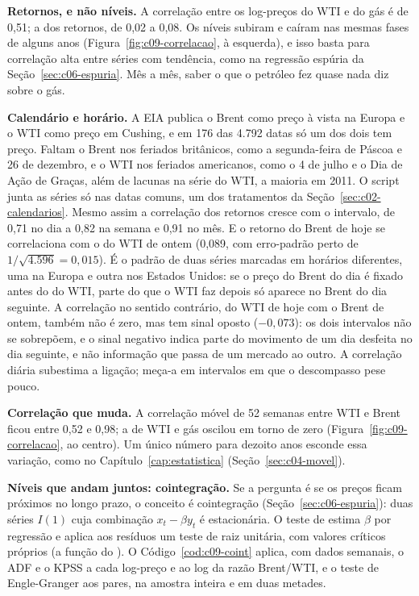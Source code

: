 
\textbf{Retornos, e não níveis.} A correlação entre os log-preços do WTI e do gás é de 0,51; a dos retornos, de 0,02 a 0,08. Os níveis subiram e caíram nas mesmas fases de alguns anos (Figura~\ref{fig:c09-correlacao}, à esquerda), e isso basta para correlação alta entre séries com tendência, como na regressão espúria da Seção~\ref{sec:c06-espuria}. Mês a mês, saber o que o petróleo fez quase nada diz sobre o gás.

\textbf{Calendário e horário.} A EIA publica o Brent como preço à vista na Europa e o WTI como preço em Cushing, e em 176 das 4.792 datas só um dos dois tem preço. Faltam o Brent nos feriados britânicos, como a segunda-feira de Páscoa e 26 de dezembro, e o WTI nos feriados americanos, como o 4 de julho e o Dia de Ação de Graças, além de lacunas na série do WTI, a maioria em 2011. O script junta as séries só nas datas comuns, um dos tratamentos da Seção~\ref{sec:c02-calendarios}. Mesmo assim a correlação dos retornos cresce com o intervalo, de 0,71 no dia a 0,82 na semana e 0,91 no mês. E o retorno do Brent de hoje se correlaciona com o do WTI de ontem (0,089, com erro-padrão perto de $1/\sqrt{4.596} = 0,015$). É o padrão de duas séries marcadas em horários diferentes, uma na Europa e outra nos Estados Unidos: se o preço do Brent do dia é fixado antes do do WTI, parte do que o WTI faz depois só aparece no Brent do dia seguinte. A correlação no sentido contrário, do WTI de hoje com o Brent de ontem, também não é zero, mas tem sinal oposto ($-0,073$): os dois intervalos não se sobrepõem, e o sinal negativo indica parte do movimento de um dia desfeita no dia seguinte, e não informação que passa de um mercado ao outro. A correlação diária subestima a ligação; meça-a em intervalos em que o descompasso pese pouco.

\textbf{Correlação que muda.} A correlação móvel de 52 semanas entre WTI e Brent ficou entre 0,52 e 0,98; a de WTI e gás oscilou em torno de zero (Figura~\ref{fig:c09-correlacao}, ao centro). Um único número para dezoito anos esconde essa variação, como no Capítulo~\ref{cap:estatistica} (Seção~\ref{sec:c04-movel}).

\textbf{Níveis que andam juntos: cointegração.} Se a pergunta é se os preços ficam próximos no longo prazo, o conceito é cointegração (Seção~\ref{sec:c06-espuria}): duas séries $I(1)$ cuja combinação $x_t - \beta y_t$ é estacionária. O teste de \citet{engle1987} estima $\beta$ por regressão e aplica aos resíduos um teste de raiz unitária, com valores críticos próprios (a função  do ). O Código~\ref{cod:c09-coint} aplica, com dados semanais, o ADF e o KPSS a cada log-preço e ao log da razão Brent/WTI, e o teste de Engle-Granger aos pares, na amostra inteira e em duas metades.

